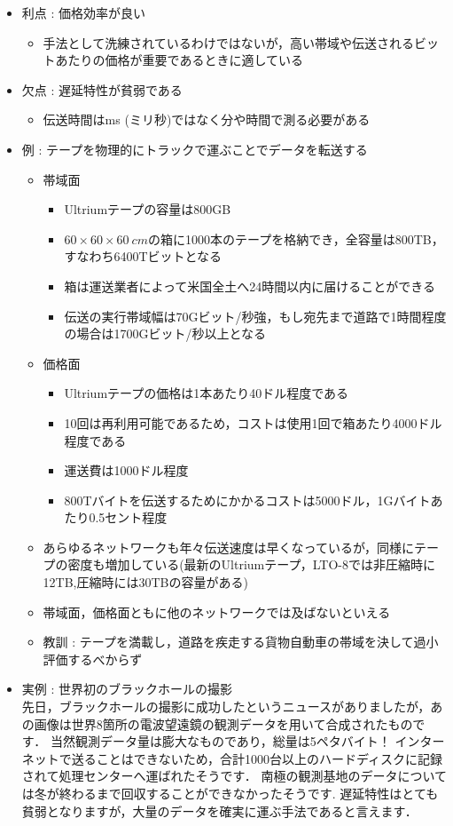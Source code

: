 \documentclass[a4paper]{ltjsarticle}
\begin{document}
			\begin{itemize}
				\item 利点 : 価格効率が良い
				\begin{itemize}
					\item 手法として洗練されているわけではないが，高い帯域や伝送されるビットあたりの価格が重要であるときに適している
				\end{itemize}
				\item 欠点 : 遅延特性が貧弱である
				\begin{itemize}
					\item 伝送時間は\si{ms} (ミリ秒)ではなく分や時間で測る必要がある
				\end{itemize}
				\item 例 : テープを物理的にトラックで運ぶことでデータを転送する
				\begin{itemize}
					\item 帯域面
					\begin{itemize}
						\item Ultriumテープの容量は800GB
						\item $60 \times 60 \times \SI{60}{cm}$の箱に1000本のテープを格納でき，全容量は800TB，すなわち6400Tビットとなる
						\item 箱は運送業者によって米国全土へ24時間以内に届けることができる
						\item 伝送の実行帯域幅は70Gビット/秒強，もし宛先まで道路で1時間程度の場合は1700Gビット/秒以上となる
					\end{itemize}
					\item 価格面
					\begin{itemize}
						\item Ultriumテープの価格は1本あたり40ドル程度である
						\item 10回は再利用可能であるため，コストは使用1回で箱あたり4000ドル程度である
						\item 運送費は1000ドル程度
						\item 800Tバイトを伝送するためにかかるコストは5000ドル，1Gバイトあたり0.5セント程度
					\end{itemize}
					\item あらゆるネットワークも年々伝送速度は早くなっているが，同様にテープの密度も増加している(最新のUltriumテープ，LTO-8では非圧縮時に12TB,圧縮時には30TBの容量がある)
					\item 帯域面，価格面ともに他のネットワークでは及ばないといえる
					\item 教訓 : テープを満載し，道路を疾走する貨物自動車の帯域を決して過小評価するべからず
				\end{itemize}
				\item 実例 : 世界初のブラックホールの撮影\\
					先日，ブラックホールの撮影に成功したというニュースがありましたが，あの画像は世界8箇所の電波望遠鏡の観測データを用いて合成されたものです．
					当然観測データ量は膨大なものであり，総量は5ペタバイト！
					インターネットで送ることはできないため，合計1000台以上のハードディスクに記録されて処理センターへ運ばれたそうです．
					南極の観測基地のデータについては冬が終わるまで回収することができなかったそうです.
					遅延特性はとても貧弱となりますが，大量のデータを確実に運ぶ手法であると言えます．
			\end{itemize}
\end{document}
